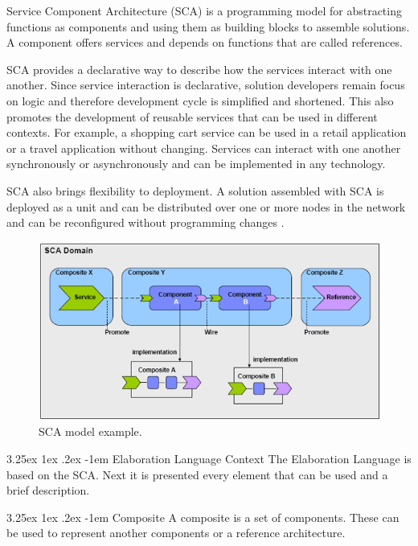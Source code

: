 \documentclass[11pt]{report}
\makeatletter
\renewcommand\paragraph{\@startsection{paragraph}{5}{\z@}%
	{3.25ex \@plus1ex \@minus.2ex}%
	{-1em}%
	{\normalfont\normalsize\bfseries}}
\renewcommand\subparagraph{\@startsection{subparagraph}{6}{\parindent}%
	{3.25ex \@plus1ex \@minus .2ex}%
	{-1em}%
	{\normalfont\normalsize\bfseries}}
\makeatother
\begin{document}
		\par Service Component Architecture (SCA) is a programming model for abstracting functions as components and using them as building blocks to assemble solutions. A component offers services and depends on functions that are called references.
		\par SCA provides a declarative way to describe how the services interact with one another. Since service interaction is declarative, solution developers remain focus on logic and therefore development cycle is simplified and shortened. This also promotes the development of reusable services that can be used in different contexts. For example, a shopping cart service can be used in a retail application or a travel application without changing. Services can interact with one another synchronously or asynchronously and can be implemented in any technology.
		\par SCA also brings flexibility to deployment. A solution assembled with SCA is deployed as a unit and can be distributed over one or more nodes in the network and can be reconfigured without programming changes \cite{apachetuscany}.
	
		\begin{figure} [H]
			\centering
			\includegraphics[width=0.8\linewidth]{Images/sca}
			\caption{SCA model example\cite{theenterprisearchitect}.}
			\label{fig:sca}
		\end{figure}
		
		\paragraph{Elaboration Language Context} The Elaboration Language is based on the SCA. Next it is presented every element that can be used and a brief description.
		
			\subparagraph{Composite} A composite is a set of components. These can be used to represent another components or a reference architecture.
		
\end{document}
